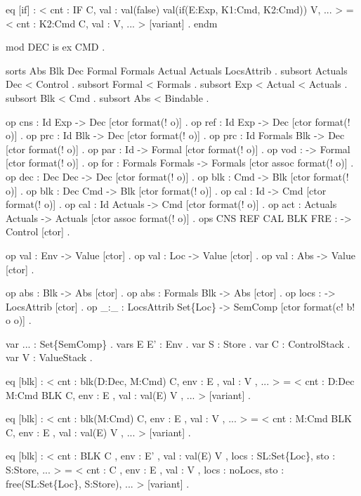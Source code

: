 \documentclass{llncs}%
\begin{document}
    eq [if] :
       < cnt : IF C,
         val : val(false) val(if(E:Exp, K1:Cmd, K2:Cmd)) V, ... > 
     =
       < cnt : K2:Cmd C,
         val : V, ... > [variant] .
endm
\nwendcode{}\nwdocspar

\nwenddocs{}\endmoddef\nwstartdeflinemarkup\nwenddeflinemarkup
mod DEC is
    ex CMD .

    sorts Abs Blk Dec Formal Formals Actual Actuals LocsAttrib .
    subsort Actuals Dec < Control .
    subsort Formal < Formals .
    subsort Exp < Actual < Actuals .
    subsort Blk < Cmd .
    subsort Abs < Bindable .

    op cns : Id Exp -> Dec [ctor format(! o)] .
    op ref : Id Exp -> Dec [ctor format(! o)] .
    op prc : Id Blk -> Dec [ctor format(! o)] .
    op prc : Id Formals Blk -> Dec [ctor format(! o)] .
    op par : Id -> Formal [ctor format(! o)] .
    op vod : -> Formal [ctor format(! o)] .
    op for : Formals Formals -> Formals [ctor assoc format(! o)] .
    op dec : Dec Dec -> Dec [ctor format(! o)] .
    op blk : Cmd -> Blk [ctor format(! o)] .
    op blk : Dec Cmd -> Blk [ctor format(! o)] .
    op cal : Id -> Cmd [ctor format(! o)] .
    op cal : Id Actuals -> Cmd [ctor format(! o)] .
    op act : Actuals Actuals -> Actuals [ctor assoc format(! o)] .
    ops CNS REF CAL BLK FRE : -> Control [ctor] .

    op val : Env -> Value [ctor] .
    op val : Loc -> Value [ctor] .
    op val : Abs -> Value [ctor] .

    op abs : Blk -> Abs [ctor] .
    op abs : Formals Blk -> Abs [ctor] .
    op locs : -> LocsAttrib [ctor] .
    op _:_ : LocsAttrib Set\{Loc\} -> SemComp [ctor format(c! b! o o)] .

    var ... : Set\{SemComp\} . vars E E' : Env . var S : Store .
    var C : ControlStack . var V : ValueStack .

    eq [blk] :
        < cnt : blk(D:Dec, M:Cmd) C, env : E , val : V , ... > 
     =
        < cnt : D:Dec M:Cmd BLK C, env : E , val : val(E) V , ... > [variant] .

    eq [blk] :
        < cnt : blk(M:Cmd) C, env : E , val : V , ... > 
     =
        < cnt : M:Cmd BLK C, env : E , val : val(E) V , ... > [variant] .

    eq [blk] :
        < cnt : BLK C ,
          env : E' ,
          val : val(E) V ,
         locs : SL:Set\{Loc\},
          sto : S:Store, ... > 
     =
        < cnt : C ,
          env : E ,
          val : V ,
         locs : noLocs,
          sto : free(SL:Set\{Loc\}, S:Store), ... > [variant] .
\end{document}
